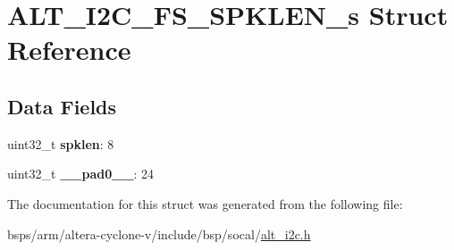 \hypertarget{structALT__I2C__FS__SPKLEN__s}{}\section{A\+L\+T\+\_\+\+I2\+C\+\_\+\+F\+S\+\_\+\+S\+P\+K\+L\+E\+N\+\_\+s Struct Reference}
\label{structALT__I2C__FS__SPKLEN__s}
\subsection*{Data Fields}
\begin{DoxyCompactItemize}
\item 
\mbox{\label{structALT__I2C__FS__SPKLEN__s_a3ba8685eee1623d7866a0e16799540a2}} 
uint32\+\_\+t {\bfseries spklen}\+: 8
\item 
\mbox{\label{structALT__I2C__FS__SPKLEN__s_afdbb17f3453a85f2a9153269ff454fb1}} 
uint32\+\_\+t {\bfseries \+\_\+\+\_\+pad0\+\_\+\+\_\+}\+: 24
\end{DoxyCompactItemize}


The documentation for this struct was generated from the following file\+:\begin{DoxyCompactItemize}
\item 
bsps/arm/altera-\/cyclone-\/v/include/bsp/socal/\mbox{\hyperlink{socal_2alt__i2c_8h}{alt\+\_\+i2c.\+h}}\end{DoxyCompactItemize}
